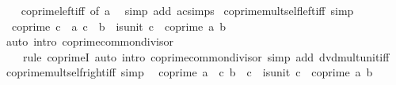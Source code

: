 \begin{isabellebody}
%
\isadelimproof
\ \ %
\endisadelimproof
%
\isatagproof
{}\isamarkupfalse%
\ coprime{\isacharunderscore}{\kern0pt}{}{\isacharunderscore}{\kern0pt}left{\isacharunderscore}{\kern0pt}iff\ {\isacharbrackleft}{\kern0pt}of\ a{\isacharbrackright}{\kern0pt}\ \isamarkupfalse%
\ {\isacharparenleft}{\kern0pt}simp\ add{\isacharcolon}{\kern0pt}\ ac{\isacharunderscore}{\kern0pt}simps{\isacharparenright}{\kern0pt}%
\endisatagproof
{\isafoldproof}%
%
\isadelimproof
\isanewline
%
\endisadelimproof
\isanewline
{}\isamarkupfalse%
\ coprime{\isacharunderscore}{\kern0pt}mult{\isacharunderscore}{\kern0pt}self{\isacharunderscore}{\kern0pt}left{\isacharunderscore}{\kern0pt}iff\ {\isacharbrackleft}{\kern0pt}simp{\isacharbrackright}{\kern0pt}{\isacharcolon}{\kern0pt}\isanewline
\ \ {\isachardoublequoteopen}coprime\ {\isacharparenleft}{\kern0pt}c\ {\isacharasterisk}{\kern0pt}\ a{\isacharparenright}{\kern0pt}\ {\isacharparenleft}{\kern0pt}c\ {\isacharasterisk}{\kern0pt}\ b{\isacharparenright}{\kern0pt}\ {\isasymlongleftrightarrow}\ is{\isacharunderscore}{\kern0pt}unit\ c\ {\isasymand}\ coprime\ a\ b{\isachardoublequoteclose}\isanewline
%
\isadelimproof
\ \ %
\endisadelimproof
%
\isatagproof
{}\isamarkupfalse%
\ {\isacharparenleft}{\kern0pt}auto\ intro{\isacharcolon}{\kern0pt}\ coprime{\isacharunderscore}{\kern0pt}common{\isacharunderscore}{\kern0pt}divisor{\isacharparenright}{\kern0pt}\isanewline
\ \ \ \ {\isacharparenleft}{\kern0pt}rule\ coprimeI{\isacharcomma}{\kern0pt}\ auto\ intro{\isacharcolon}{\kern0pt}\ coprime{\isacharunderscore}{\kern0pt}common{\isacharunderscore}{\kern0pt}divisor\ simp\ add{\isacharcolon}{\kern0pt}\ dvd{\isacharunderscore}{\kern0pt}mult{\isacharunderscore}{\kern0pt}unit{\isacharunderscore}{\kern0pt}iff{\isacharprime}{\kern0pt}{\isacharparenright}{\kern0pt}{\isacharplus}{\kern0pt}%
\endisatagproof
{\isafoldproof}%
%
\isadelimproof
\isanewline
%
\endisadelimproof
\isanewline
{}\isamarkupfalse%
\ coprime{\isacharunderscore}{\kern0pt}mult{\isacharunderscore}{\kern0pt}self{\isacharunderscore}{\kern0pt}right{\isacharunderscore}{\kern0pt}iff\ {\isacharbrackleft}{\kern0pt}simp{\isacharbrackright}{\kern0pt}{\isacharcolon}{\kern0pt}\isanewline
\ \ {\isachardoublequoteopen}coprime\ {\isacharparenleft}{\kern0pt}a\ {\isacharasterisk}{\kern0pt}\ c{\isacharparenright}{\kern0pt}\ {\isacharparenleft}{\kern0pt}b\ {\isacharasterisk}{\kern0pt}\ c{\isacharparenright}{\kern0pt}\ {\isasymlongleftrightarrow}\ is{\isacharunderscore}{\kern0pt}unit\ c\ {\isasymand}\ coprime\ a\ b{\isachardoublequoteclose}\isanewline

\end{isabellebody}
